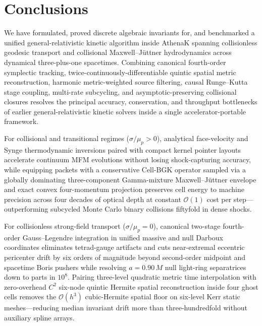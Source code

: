 \section{Conclusions}\label{sec:conclusions}

We have formulated, proved discrete algebraic invariants for, and benchmarked a unified general-relativistic kinetic algorithm inside AthenaK spanning collisionless geodesic transport and collisional Maxwell--J\"uttner hydrodynamics across dynamical three-plus-one spacetimes. Combining canonical fourth-order symplectic tracking, twice-continuously-differentiable quintic spatial metric reconstruction, harmonic metric-weighted source filtering, causal Runge--Kutta stage coupling, multi-rate subcycling, and asymptotic-preserving collisional closures resolves the principal accuracy, conservation, and throughput bottlenecks of earlier general-relativistic kinetic solvers inside a single accelerator-portable framework.

For collisional and transitional regimes ($\sigma/\mu_p > 0$), analytical face-velocity and Synge thermodynamic inversions paired with compact kernel pointer layouts accelerate continuum MFM evolutions without losing shock-capturing accuracy, while equipping packets with a conservative Cell-BGK operator sampled via a globally dominating three-component Gamma-mixture Maxwell--J\"uttner envelope and exact convex four-momentum projection preserves cell energy to machine precision across four decades of optical depth at constant $\mathcal{O}(1)$ cost per step—outperforming subcycled Monte Carlo binary collisions fiftyfold in dense shocks.

For collisionless strong-field transport ($\sigma/\mu_p = 0$), canonical two-stage fourth-order Gauss--Legendre integration in unified massive and null Darboux coordinates eliminates tetrad-gauge artifacts and cuts near-extremal eccentric pericenter drift by six orders of magnitude beyond second-order midpoint and spacetime Boris pushers while resolving $a = 0.90\,M$ null light-ring separatrices down to parts in $10^8$. Pairing three-level quadratic metric time interpolation with zero-overhead $C^2$ six-node quintic Hermite spatial reconstruction inside four ghost cells removes the $\mathcal{O}(h^3)$ cubic-Hermite spatial floor on six-level Kerr static meshes—reducing median invariant drift more than three-hundredfold without auxiliary spline arrays.


